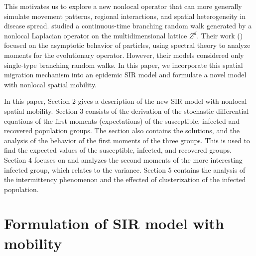 \documentclass[sn-basic]{sn-jnl}%
\theoremstyle{thmstyleone}%
\theoremstyle{thmstyletwo}%
\theoremstyle{thmstylethree}%
\numberwithin{equation}{theorem}
\begin{document}
This motivates us to explore a new nonlocal operator that can more generally simulate movement patterns, regional interactions, and spatial heterogeneity in disease spread. \citep{19} studied a continuous-time branching random walk generated by a nonlocal Laplacian operator on the multidimensional lattice $Z^d$. Their work (\citep{19,25,28}) focused on the asymptotic behavior of particles, using spectral theory to analyze moments for the evolutionary operator. However, their models considered only single-type branching random walks. In this paper, we incorporate this spatial migration mechanism into an epidemic SIR model and formulate a novel model with nonlocal spatial mobility.

In this paper, Section 2 gives a description of the new SIR model with nonlocal spatial mobility. Section 3 consists of the derivation of the stochastic differential equations of the first moments (expectations) of the susceptible, infected and recovered population groups. The section also contains the solutions, and the analysis of the behavior of the first moments of the three groups. This is used to find the expected values of the susceptible, infected, and recovered groups. Section 4 focuses on and analyzes the second moments of the more interesting infected group, which relates to the variance. Section 5 contains the analysis of the intermittency phenomenon and the effected of clusterization of the infected population. 



\section{Formulation of SIR model with mobility}
\end{document}
